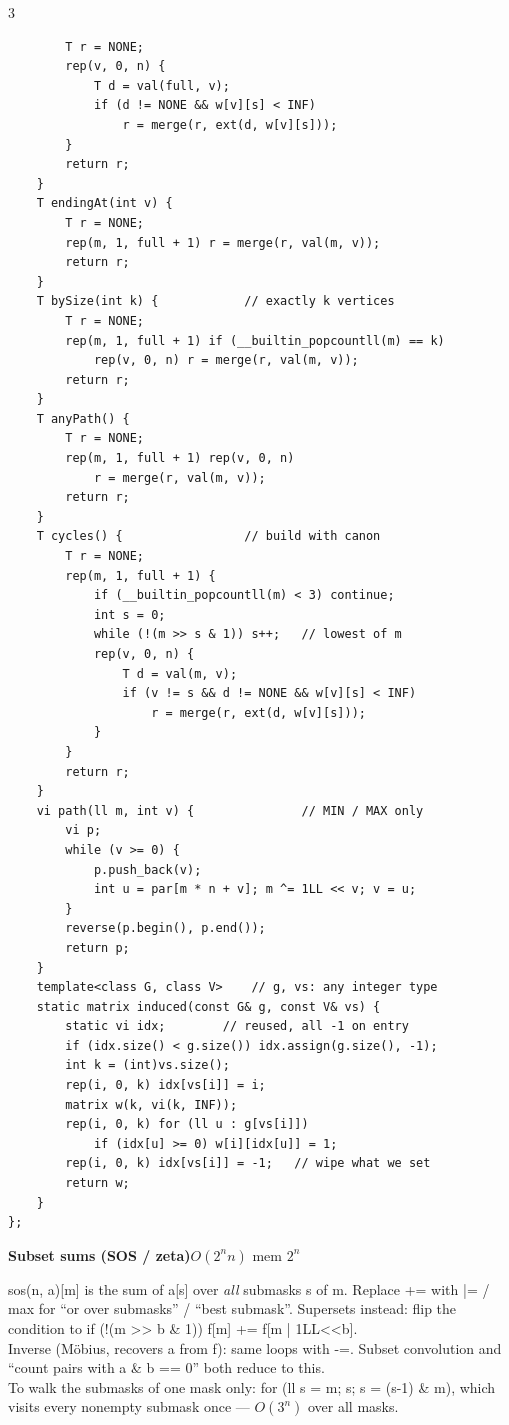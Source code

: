 \documentclass[9pt,a4paper]{extarticle}
\newcommand{\entry}[3]{%
  \addcontentsline{toc}{subsection}{#1}%
  \vspace{0.8ex}%
  \noindent\colorbox{hdbg}{\parbox{\dimexpr\columnwidth-2\fboxsep}{%
    \strut\textbf{#1}\hfill{\footnotesize\textsf{#2}}}}\par
  \vspace{0.4ex}%
  {\footnotesize #3\par}%
}
\newcommand{\code}[1]{{\ttfamily\small #1}}
\begin{document}
\begin{multicols*}{3}
\begin{lstlisting}
        T r = NONE;
        rep(v, 0, n) {
            T d = val(full, v);
            if (d != NONE && w[v][s] < INF)
                r = merge(r, ext(d, w[v][s]));
        }
        return r;
    }
    T endingAt(int v) {
        T r = NONE;
        rep(m, 1, full + 1) r = merge(r, val(m, v));
        return r;
    }
    T bySize(int k) {            // exactly k vertices
        T r = NONE;
        rep(m, 1, full + 1) if (__builtin_popcountll(m) == k)
            rep(v, 0, n) r = merge(r, val(m, v));
        return r;
    }
    T anyPath() {
        T r = NONE;
        rep(m, 1, full + 1) rep(v, 0, n)
            r = merge(r, val(m, v));
        return r;
    }
    T cycles() {                 // build with canon
        T r = NONE;
        rep(m, 1, full + 1) {
            if (__builtin_popcountll(m) < 3) continue;
            int s = 0;
            while (!(m >> s & 1)) s++;   // lowest of m
            rep(v, 0, n) {
                T d = val(m, v);
                if (v != s && d != NONE && w[v][s] < INF)
                    r = merge(r, ext(d, w[v][s]));
            }
        }
        return r;
    }
    vi path(ll m, int v) {               // MIN / MAX only
        vi p;
        while (v >= 0) {
            p.push_back(v);
            int u = par[m * n + v]; m ^= 1LL << v; v = u;
        }
        reverse(p.begin(), p.end());
        return p;
    }
    template<class G, class V>    // g, vs: any integer type
    static matrix induced(const G& g, const V& vs) {
        static vi idx;        // reused, all -1 on entry
        if (idx.size() < g.size()) idx.assign(g.size(), -1);
        int k = (int)vs.size();
        rep(i, 0, k) idx[vs[i]] = i;
        matrix w(k, vi(k, INF));
        rep(i, 0, k) for (ll u : g[vs[i]])
            if (idx[u] >= 0) w[i][idx[u]] = 1;
        rep(i, 0, k) idx[vs[i]] = -1;   // wipe what we set
        return w;
    }
};
\end{lstlisting}

\entry{Subset sums (SOS / zeta)}{$O(2^n n)$ \quad mem $2^n$}{%
\code{sos(n, a)[m]} is the sum of \code{a[s]} over \emph{all} submasks \code{s} of
\code{m}. Replace \code{+=} with \code{|=} / \code{max} for ``or over submasks'' /
``best submask''. Supersets instead: flip the condition to
\code{if (!(m >> b \& 1)) f[m] += f[m | 1LL<<b]}.\\[0.3ex]
Inverse (M\"obius, recovers \code{a} from \code{f}): same loops with \code{-=}.
Subset convolution and ``count pairs with \code{a \& b == 0}'' both reduce to
this.\\[0.3ex]
To walk the submasks of one mask only: \code{for (ll s = m; s; s = (s-1) \& m)}, which
visits every nonempty submask once --- $O(3^n)$ over all masks.}


\end{multicols*}
\end{document}
